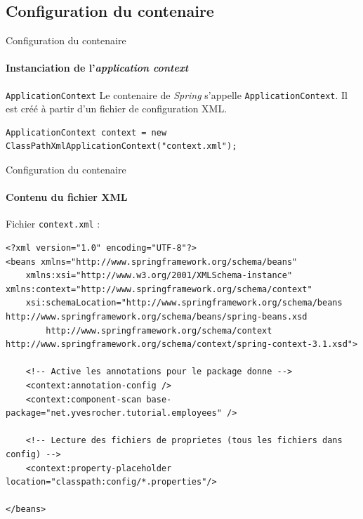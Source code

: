 \documentclass[compress]{beamer}%
\begin{document}
\subsection{Configuration du contenaire}

\begin{frame}[fragile]{Configuration du contenaire}
	\framesubtitle{Instanciation de l'\emph{application context}}

	\begin{block}{\texttt{ApplicationContext}}
		Le contenaire de \emph{Spring} s'appelle \texttt{ApplicationContext}. Il est créé à partir d'un fichier de configuration XML.
	\end{block}

	\pause
	\begin{lstlisting}
ApplicationContext context = new ClassPathXmlApplicationContext("context.xml");
	\end{lstlisting}

\end{frame}


\begin{frame}[containsverbatim]{Configuration du contenaire}
	\framesubtitle{Contenu du fichier XML}

	Fichier \texttt{context.xml} : 
	\lstset{language=XML}
	\begin{lstlisting}
<?xml version="1.0" encoding="UTF-8"?>
<beans xmlns="http://www.springframework.org/schema/beans"
	xmlns:xsi="http://www.w3.org/2001/XMLSchema-instance" xmlns:context="http://www.springframework.org/schema/context"
	xsi:schemaLocation="http://www.springframework.org/schema/beans http://www.springframework.org/schema/beans/spring-beans.xsd
		http://www.springframework.org/schema/context http://www.springframework.org/schema/context/spring-context-3.1.xsd">

	<!-- Active les annotations pour le package donne -->
	<context:annotation-config />
	<context:component-scan base-package="net.yvesrocher.tutorial.employees" />

	<!-- Lecture des fichiers de proprietes (tous les fichiers dans config) -->
	<context:property-placeholder location="classpath:config/*.properties"/>
	
</beans>
	\end{lstlisting}
	\lstset{language=JAVA}

\end{frame}
\end{document}

